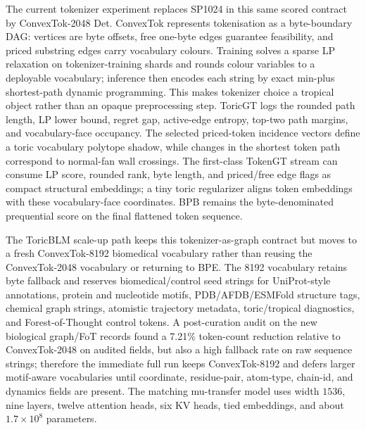 \documentclass[10pt]{article}
\theoremstyle{definition}
\theoremstyle{plain}
\theoremstyle{remark}
\begin{document}
The current tokenizer experiment replaces SP1024 in this same scored contract
by ConvexTok-2048 Det.  ConvexTok represents tokenisation as a byte-boundary
DAG: vertices are byte offsets, free one-byte edges guarantee feasibility, and
priced substring edges carry vocabulary colours.  Training solves a sparse LP
relaxation on tokenizer-training shards and rounds colour variables to a
deployable vocabulary; inference then encodes each string by exact min-plus
shortest-path dynamic programming.  This makes tokenizer choice a tropical
object rather than an opaque preprocessing step.  ToricGT logs the rounded
path length, LP lower bound, regret gap, active-edge entropy, top-two path
margins, and vocabulary-face occupancy.  The selected priced-token incidence
vectors define a toric vocabulary polytope shadow, while changes in the
shortest token path correspond to normal-fan wall crossings.  The first-class
TokenGT stream can consume LP score, rounded rank, byte length, and priced/free
edge flags as compact structural embeddings; a tiny toric regularizer aligns
token embeddings with these vocabulary-face coordinates.  BPB remains the
byte-denominated prequential score on the final flattened token sequence.

The ToricBLM scale-up path keeps this tokenizer-as-graph contract but moves to
a fresh ConvexTok-8192 biomedical vocabulary rather than reusing the
ConvexTok-2048 vocabulary or returning to BPE.  The 8192 vocabulary retains
byte fallback and reserves biomedical/control seed strings for UniProt-style
annotations, protein and nucleotide motifs, PDB/AFDB/ESMFold structure tags,
chemical graph strings, atomistic trajectory metadata, toric/tropical
diagnostics, and Forest-of-Thought control tokens.  A post-curation audit on
the new biological graph/FoT records found a 7.21\% token-count reduction
relative to ConvexTok-2048 on audited fields, but also a high fallback rate on
raw sequence strings; therefore the immediate full run keeps ConvexTok-8192
and defers larger motif-aware vocabularies until coordinate, residue-pair,
atom-type, chain-id, and dynamics fields are present.  The matching
mu-transfer model uses width $1536$, nine layers, twelve attention heads, six
KV heads, tied embeddings, and about $1.7\times10^8$ parameters.
\end{document}
